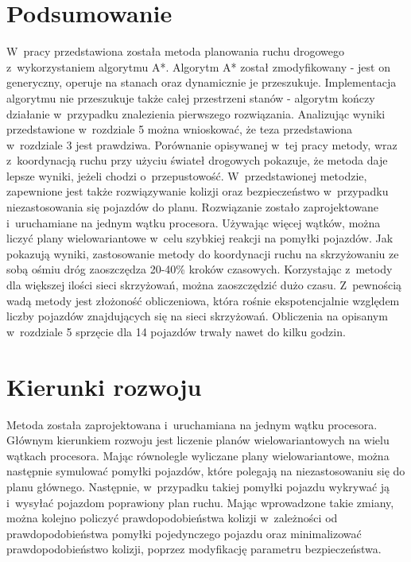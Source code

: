  \label{chap:conclusions}

\section {Podsumowanie}

W~pracy przedstawiona została metoda planowania ruchu drogowego z~wykorzystaniem algorytmu A*. Algorytm A* został zmodyfikowany - jest on generyczny, operuje na stanach oraz dynamicznie je przeszukuje. Implementacja algorytmu nie przeszukuje także całej przestrzeni stanów - algorytm kończy działanie w~przypadku znalezienia pierwszego rozwiązania.
\newline
\indent
Analizując wyniki przedstawione w~rozdziale 5 można wnioskować, że teza przedstawiona w~rozdziale 3 jest prawdziwa. Porównanie opisywanej w~tej pracy metody, wraz z~koordynacją ruchu przy użyciu świateł drogowych pokazuje, że metoda daje lepsze wyniki, jeżeli chodzi o~przepustowość. W~przedstawionej metodzie, zapewnione jest także rozwiązywanie kolizji oraz bezpieczeństwo w~przypadku niezastosowania się pojazdów do planu. Rozwiązanie zostało zaprojektowane i~uruchamiane na jednym wątku procesora. Używając więcej wątków, można liczyć plany wielowariantowe w~celu szybkiej reakcji na pomyłki pojazdów.
\newline
\indent
Jak pokazują wyniki, zastosowanie metody do koordynacji ruchu na skrzyżowaniu ze sobą ośmiu dróg zaoszczędza 20-40\% kroków czasowych. Korzystając z~metody dla większej ilości sieci skrzyżowań, można zaoszczędzić dużo czasu.
\newline
\indent
Z~pewnością wadą metody jest złożoność obliczeniowa, która rośnie ekspotencjalnie względem liczby pojazdów znajdujących się na sieci skrzyżowań. Obliczenia na opisanym w~rozdziale 5 sprzęcie dla 14 pojazdów trwały nawet do kilku godzin.

\section{Kierunki rozwoju}

Metoda została zaprojektowana i~uruchamiana na jednym wątku procesora. Głównym kierunkiem rozwoju jest liczenie planów wielowariantowych na wielu wątkach procesora. Mając równolegle wyliczane plany wielowariantowe, można następnie symulować pomyłki pojazdów, które polegają na niezastosowaniu się do planu głównego. Następnie, w~przypadku takiej pomyłki pojazdu wykrywać ją i~wysyłać pojazdom poprawiony plan ruchu. Mając wprowadzone takie zmiany, można kolejno policzyć prawdopodobieństwa kolizji w~zależności od prawdopodobieństwa pomyłki pojedynczego pojazdu oraz minimalizować prawdopodobieństwo kolizji, poprzez modyfikację parametru bezpieczeństwa.

